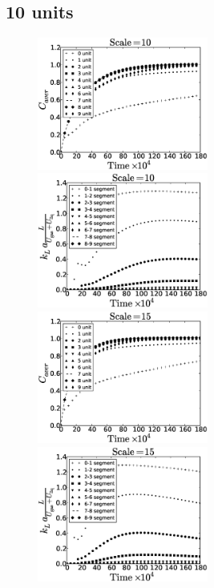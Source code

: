 \documentclass{article}
\begin{document}
\subsection{10 units} 
\begin{figure}[htb!]
\includegraphics[width=0.5\textwidth]{Figures/aver_units10scale10.eps}\hfill
\includegraphics[width=0.5\textwidth]{Figures/coeff_units10scale10.eps}\\
\includegraphics[width=0.5\textwidth]{Figures/aver_units10scale15.eps}\hfill
\includegraphics[width=0.5\textwidth]{Figures/coeff_units10scale15.eps}\\

\end{figure}
\end{document}
